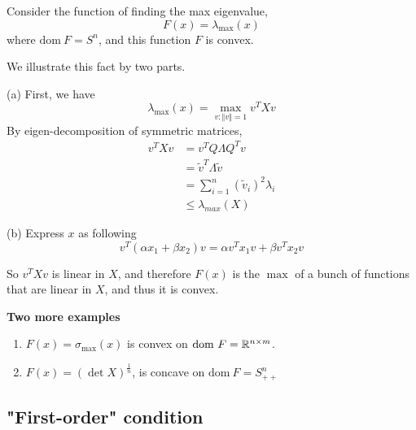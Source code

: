 \vspace{0.5cm}
\begin{example}
Consider the function of finding the max eigenvalue,
$$F(x) = \lambda_{\max}(x)$$
where $\text{dom}\ F = S^n$, and this function $F$ is convex.

We illustrate this fact by two parts.

(a) First, we have
$$\lambda_{\max}(x) = \max_{v:\Vert v\Vert = 1}v^TXv$$
By eigen-decomposition of symmetric matrices,
\begin{align*}
v^TXv 
&= v^TQ\Lambda Q^Tv \\
&= \tilde{v}^T\Lambda \tilde{v}\\
&= \sum^n_{i=1}(\tilde{v}_i)^2\lambda_i \\
&\leq \lambda_{max}(X)
\end{align*}

(b) Express $x$ as following
\begin{equation*}
v^T(\alpha x_1 + \beta x_2)v = \alpha v^Tx_1v + \beta v^Tx_2v
\end{equation*}

So $v^TXv$ is linear in $X$, and therefore $F(x)$ is the $\max$ of a bunch of functions that are linear in $X$, and thus it is convex.
\end{example}

\vspace{0.3cm}
\textbf{Two more examples}
\begin{enumerate}
	\item $F(x) = \sigma_{\max} (x)$ is convex on $\text{dom}\ F =\mathbb{R}^{n\times m}$.
	
	\item $F(x) = (\det X)^{\frac{1}{n}}$, is concave on $\text{dom}\ F = S^n_{++}$
\end{enumerate}

\vspace{0.5cm}
\subsection{"First-order" condition}

